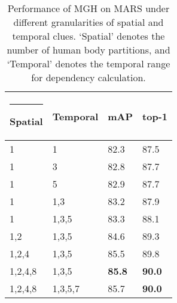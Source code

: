 \documentclass[10pt,twocolumn,letterpaper]{article}
\makeatletter
\newcommand{\thickhline}{\noalign {\ifnum 0=`}\fi \hrule height 1pt
    \futurelet \reserved@a \@xhline
}
\makeatother
\begin{document}
\begin{table}[t]
\setlength{\abovecaptionskip}{-0.01mm}
\centering
\begin{tabular}{p{1.5cm}<{\centering} p{1.5cm}<{\centering}|p{1.3cm}<{\centering} p{1.3cm}<{\centering}}
\hline\thickhline
\rowcolor{mygray} 
Spatial  & Temporal  & mAP  & top-1  \\  \hline \hline     
1  & 1  & 82.3  & 87.5   \\
1  & 3  & 82.8  & 87.7   \\
1  & 5  & 82.9  & 87.7   \\
1  & 1,3  & 83.2  & 87.9   \\
1  & 1,3,5  & 83.3  & 88.1   \\\hline
1,2   & 1,3,5  & 84.6   & 89.3    \\ \hline
1,2,4   & 1,3,5       & 85.5   & 89.8  \\\hline
 1,2,4,8   & 1,3,5       & \textbf{85.8}   & \textbf{90.0} \\
1,2,4,8   & 1,3,5,7       & 85.7   & \textbf{90.0} \\ \hline
\end{tabular}
\caption{Performance of MGH on MARS under different granularities of spatial and temporal clues. `Spatial' denotes the number of human body partitions, and `Temporal' denotes the temporal range for dependency calculation.}
\label{tab:granularity}
\end{table}
\end{document}
